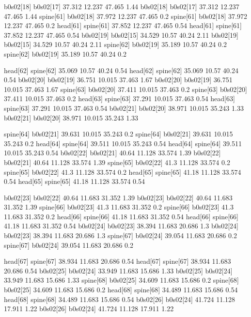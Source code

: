 b0s02[18]    b0s02[17]    37.312    12.237    47.465    1.44
b0s02[18]    b0s02[17]    37.312    12.237    47.465    1.44
spine[61]    b0s02[18]    37.972    12.237    47.465    0.2
spine[61]    b0s02[18]    37.972    12.237    47.465    0.2
head[61]    spine[61]    37.852    12.237    47.465    0.54
head[61]    spine[61]    37.852    12.237    47.465    0.54
b0s02[19]    b0s02[15]    34.529    10.57    40.24    2.11
b0s02[19]    b0s02[15]    34.529    10.57    40.24    2.11
spine[62]    b0s02[19]    35.189    10.57    40.24    0.2
spine[62]    b0s02[19]    35.189    10.57    40.24    0.2


head[62]    spine[62]    35.069    10.57    40.24    0.54
head[62]    spine[62]    35.069    10.57    40.24    0.54
b0s02[20]    b0s02[19]    36.751    10.015    37.463    1.67
b0s02[20]    b0s02[19]    36.751    10.015    37.463    1.67
spine[63]    b0s02[20]    37.411    10.015    37.463    0.2
spine[63]    b0s02[20]    37.411    10.015    37.463    0.2
head[63]    spine[63]    37.291    10.015    37.463    0.54
head[63]    spine[63]    37.291    10.015    37.463    0.54
b0s02[21]    b0s02[20]    38.971    10.015    35.243    1.33
b0s02[21]    b0s02[20]    38.971    10.015    35.243    1.33


spine[64]    b0s02[21]    39.631    10.015    35.243    0.2
spine[64]    b0s02[21]    39.631    10.015    35.243    0.2
head[64]    spine[64]    39.511    10.015    35.243    0.54
head[64]    spine[64]    39.511    10.015    35.243    0.54
b0s02[22]    b0s02[21]    40.64    11.128    33.574    1.39
b0s02[22]    b0s02[21]    40.64    11.128    33.574    1.39
spine[65]    b0s02[22]    41.3    11.128    33.574    0.2
spine[65]    b0s02[22]    41.3    11.128    33.574    0.2
head[65]    spine[65]    41.18    11.128    33.574    0.54
head[65]    spine[65]    41.18    11.128    33.574    0.54


b0s02[23]    b0s02[22]    40.64    11.683    31.352    1.39
b0s02[23]    b0s02[22]    40.64    11.683    31.352    1.39
spine[66]    b0s02[23]    41.3    11.683    31.352    0.2
spine[66]    b0s02[23]    41.3    11.683    31.352    0.2
head[66]    spine[66]    41.18    11.683    31.352    0.54
head[66]    spine[66]    41.18    11.683    31.352    0.54
b0s02[24]    b0s02[23]    38.394    11.683    20.686    1.3
b0s02[24]    b0s02[23]    38.394    11.683    20.686    1.3
spine[67]    b0s02[24]    39.054    11.683    20.686    0.2
spine[67]    b0s02[24]    39.054    11.683    20.686    0.2


head[67]    spine[67]    38.934    11.683    20.686    0.54
head[67]    spine[67]    38.934    11.683    20.686    0.54
b0s02[25]    b0s02[24]    33.949    11.683    15.686    1.33
b0s02[25]    b0s02[24]    33.949    11.683    15.686    1.33
spine[68]    b0s02[25]    34.609    11.683    15.686    0.2
spine[68]    b0s02[25]    34.609    11.683    15.686    0.2
head[68]    spine[68]    34.489    11.683    15.686    0.54
head[68]    spine[68]    34.489    11.683    15.686    0.54
b0s02[26]    b0s02[24]    41.724    11.128    17.911    1.22
b0s02[26]    b0s02[24]    41.724    11.128    17.911    1.22


